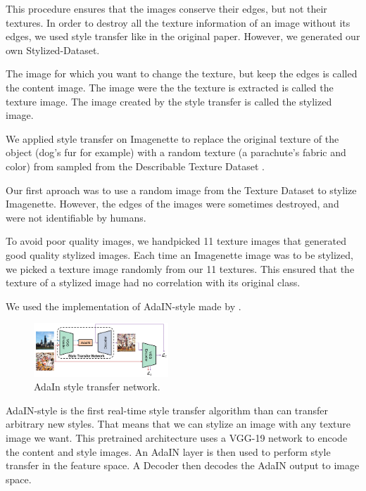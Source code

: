 \documentclass{article}
\begin{document}
This procedure ensures that the images conserve their edges, but not their textures.
In order to destroy all the texture information of an image without its edges, we used style transfer like in
the original paper.
However, we generated our own Stylized-Dataset. \smallskip

\noindent
The image for which you want to change the texture, but keep the edges is called the content image.
The image were the the texture is extracted is called the texture image.
The image created by the style transfer is called the stylized image. \smallskip

\noindent
We applied style transfer on Imagenette to replace the original texture of the object (dog's fur for example) 
with a random texture (a parachute's fabric and color) 
from sampled from the Describable Texture Dataset \cite{cimpoi14describing}. \smallskip

\noindent
Our first aproach was to use a random image from the Texture Dataset to stylize Imagenette. However, 
the edges of the images were sometimes destroyed, and were not identifiable by humans. \smallskip

\noindent
To avoid poor quality images, we handpicked 11 texture images that generated good quality stylized images.
Each time an Imagenette image was to be stylized, we picked a texture image randomly from our 11 textures.
This ensured that the texture of a stylized image had no correlation with its original class. \smallskip

\noindent
We used the implementation of AdaIN-style \cite{huang2017arbitrary} made by \cite{stylizeddatasets2019}.
\begin{figure}[h!]\center
  \includegraphics[width=0.45\textwidth]{imgs/adain_architecture}
  \caption{AdaIn style transfer network.}
\end{figure}

AdaIN-style is the first real-time style transfer algorithm than can transfer arbitrary new styles.
That means that we can stylize an image with any texture image we want.
This pretrained architecture uses a VGG-19 network to encode the content and style images.
An AdaIN layer is then used to perform style transfer in the feature space.   
A Decoder then decodes the AdaIN output to image space.
\end{document}
